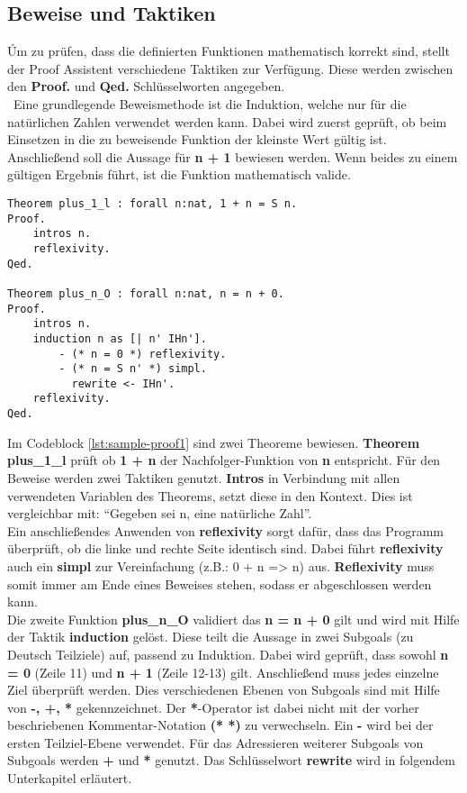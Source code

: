 \subsection{Beweise und Taktiken}
Úm zu prüfen, dass die definierten Funktionen mathematisch korrekt sind, stellt der Proof Assistent verschiedene Taktiken zur Verfügung. Diese werden zwischen den \textbf{Proof.} und \textbf{Qed.} Schlüsselworten angegeben.\\\
Eine grundlegende Beweismethode ist die Induktion, welche nur für die natürlichen Zahlen verwendet werden kann. Dabei wird zuerst geprüft, ob beim Einsetzen in die zu beweisende Funktion der kleinste Wert gültig ist. Anschließend soll die Aussage für \textbf{n + 1} bewiesen werden. Wenn beides zu einem gültigen Ergebnis führt, ist die Funktion mathematisch valide.
\begin{lstlisting}[language=coq,firstnumber=1,caption=Coq Beispielbeweis,label=lst:sample-proof1]
Theorem plus_1_l : forall n:nat, 1 + n = S n.
Proof.
	intros n. 
	reflexivity. 
Qed.

Theorem plus_n_O : forall n:nat, n = n + 0.
Proof.
	intros n. 
	induction n as [| n' IHn'].
		- (* n = 0 *) reflexivity.
		- (* n = S n' *) simpl.
		  rewrite <- IHn'.
	reflexivity.
Qed.
\end{lstlisting}
Im Codeblock \ref{lst:sample-proof1} sind zwei Theoreme bewiesen. \textbf{Theorem plus\_1\_l} prüft ob \textbf{1 + n} der Nachfolger-Funktion von \textbf{n} entspricht.
Für den Beweise werden zwei Taktiken genutzt. \textbf{Intros} in Verbindung mit allen verwendeten Variablen des Theorems, setzt diese in den Kontext. Dies ist vergleichbar mit: "`Gegeben sei n, eine natürliche Zahl"'.\\
Ein anschließendes Anwenden von \textbf{reflexivity} sorgt dafür, dass das Programm überprüft, ob die linke und rechte Seite identisch sind. Dabei führt \textbf{reflexivity} auch ein \textbf{simpl} zur Vereinfachung (z.B.: 0 + n => n) aus. \textbf{Reflexivity} muss somit immer am Ende eines Beweises stehen, sodass er abgeschlossen werden kann.\\
Die zweite Funktion \textbf{plus\_n\_O} validiert das \textbf{n = n + 0} gilt und wird mit Hilfe der Taktik \textbf{induction} gelöst. Diese teilt die Aussage in zwei Subgoals (zu Deutsch Teilziele) auf, passend zu Induktion. Dabei wird geprüft, dass sowohl \textbf{n = 0} (Zeile 11) und \textbf{n + 1} (Zeile 12-13) gilt.
Anschließend muss jedes einzelne Ziel überprüft werden. Dies verschiedenen Ebenen von Subgoals sind mit Hilfe von \textbf{-, +, *} gekennzeichnet. Der \textbf{*}-Operator ist dabei nicht mit der vorher beschriebenen Kommentar-Notation \textbf{(* *)} zu verwechseln. Ein \textbf{-} wird bei der ersten Teilziel-Ebene verwendet. Für das Adressieren weiterer Subgoals von Subgoals werden \textbf{+} und \textbf{*} genutzt. Das Schlüsselwort \textbf{rewrite} wird in folgendem Unterkapitel erläutert.

